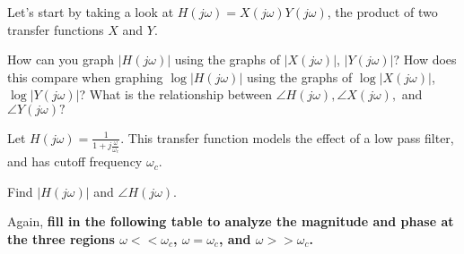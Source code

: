 \begin{enumerate}

\qitem Let's start by taking a look at $H(j \omega) = X(j \omega)Y(j \omega)$, the product of two transfer functions $X$ and $Y$.
\begin{enumerate}
    \qitem How can you graph $|H(j \omega)|$ using the graphs of $|X(j \omega)|$, $|Y(j \omega)|$?
    \qitem How does this compare when graphing $\log |H(j \omega)|$ using the graphs of $\log |X(j \omega)|$, $\log |Y(j \omega)|$?
    \qitem What is the relationship between $\angle H(j \omega), \angle X(j \omega),$ and $\angle Y(j \omega)?$
\end{enumerate}


\qitem Let $H(j \omega) = \frac{1}{1 + j \frac{\omega}{\omega_c}}$. This transfer function models the effect of a low pass filter, and has cutoff frequency $\omega_{c}.$

\begin{enumerate}
    \qitem Find $|H(j \omega)|$ and $\angle H(j \omega)$.


    \qitem Again, \textbf{fill in the following table to analyze the magnitude and phase at the three regions $\omega << \omega_{c}$, $\omega = \omega_{c}$, and $\omega >> \omega_{c}$.}


\end{enumerate}
\end{enumerate}
